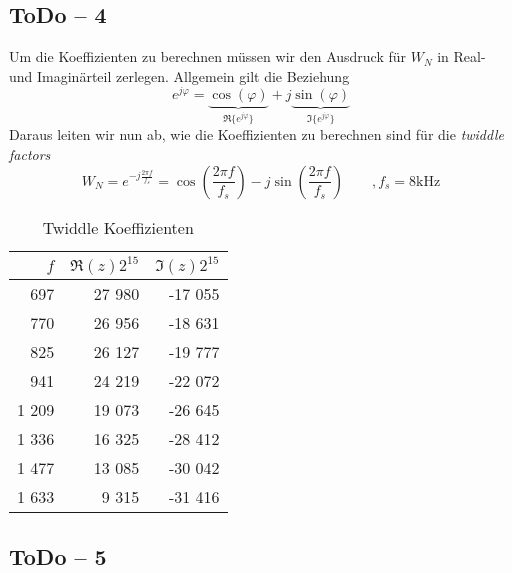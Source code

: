 \newpage
\subsection{ToDo -- 4}
Um die Koeffizienten zu berechnen müssen wir den Ausdruck für $W_N$ in
Real- und Imaginärteil zerlegen. Allgemein gilt die Beziehung
\[
	e^{j\varphi} =
		\underbrace{\cos(\varphi)}_{\Re\{e^{j\varphi}\}}
		+ j \underbrace{\sin(\varphi)}_{\Im\{e^{j\varphi}\}}
\]
Daraus leiten wir nun ab, wie die Koeffizienten zu berechnen sind für die
\emph{twiddle factors}
\[
	W_N
	= e^{-j\frac{2 \pi f}{f_s}}
	= \cos\left(\frac{2 \pi f}{f_s}\right)
		- j\sin\left(\frac{2 \pi f}{f_s}\right)
	\qquad , f_s = 8 \text{kHz}
\]

\begin{table}[h!]
	\centering
	\begin{tabular}{r r r}
		$f$	& $\Re(z) 2^{15}$	& $\Im(z) 2^{15}$ \\
		\hline
		697	& 27 980	& -17 055 \\
		770	& 26 956	& -18 631 \\
		825	& 26 127	& -19 777 \\
		941	& 24 219	& -22 072 \\
		1 209	& 19 073	& -26 645 \\
		1 336	& 16 325	& -28 412 \\
		1 477	& 13 085	& -30 042 \\
		1 633	& 9 315		& -31 416 \\
	\end{tabular}
	\caption{Twiddle Koeffizienten}
\end{table}



\subsection{ToDo -- 5}

